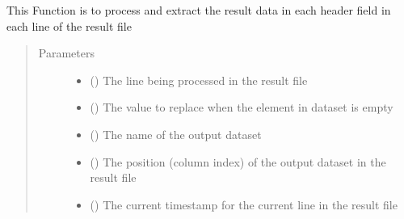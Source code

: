 \documentclass[letterpaper,10pt,english]{sphinxmanual}
\begin{document}
\begin{fulllineitems}
\begin{fulllineitems}
\end{fulllineitems}


\begin{fulllineitems}
\label{\detokenize{AgentTools.util:AgentTools.util.OutputUtil.OutputUtil.process_results_line}}
This Function is to process and extract the result data in each header field in each line of the result file
\begin{quote}\begin{description}
\item[{Parameters}] \leavevmode\begin{itemize}
\item {} 
 () \textendash{} The line being processed in the result file

\item {} 
 () \textendash{} The value to replace when the element in dataset is empty

\item {} 
 () \textendash{} The name of the output dataset

\item {} 
 () \textendash{} The position (column index) of the output dataset in the result file

\item {} 
 () \textendash{} The current timestamp for the current line in the result file


\end{itemize}
\end{description}
\end{quote}
\end{fulllineitems}
\end{fulllineitems}
\end{document}
